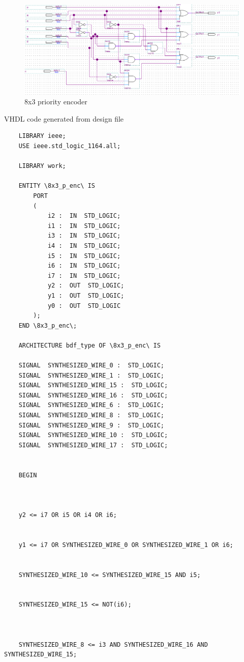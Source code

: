 \documentclass[12pt]{article}
\begin{document}
\begin{figure}[h]
\caption{8x3 priority encoder}
\centering
\includegraphics[width=\textwidth]{./diagrams/8x3_penc_design.png}
\end{figure}
{VHDL code generated from design file}
\begin{verbatim}
    LIBRARY ieee;
    USE ieee.std_logic_1164.all; 
    
    LIBRARY work;
    
    ENTITY \8x3_p_enc\ IS 
    	PORT
    	(
    		i2 :  IN  STD_LOGIC;
    		i1 :  IN  STD_LOGIC;
    		i3 :  IN  STD_LOGIC;
    		i4 :  IN  STD_LOGIC;
    		i5 :  IN  STD_LOGIC;
    		i6 :  IN  STD_LOGIC;
    		i7 :  IN  STD_LOGIC;
    		y2 :  OUT  STD_LOGIC;
    		y1 :  OUT  STD_LOGIC;
    		y0 :  OUT  STD_LOGIC
    	);
    END \8x3_p_enc\;
    
    ARCHITECTURE bdf_type OF \8x3_p_enc\ IS 
    
    SIGNAL	SYNTHESIZED_WIRE_0 :  STD_LOGIC;
    SIGNAL	SYNTHESIZED_WIRE_1 :  STD_LOGIC;
    SIGNAL	SYNTHESIZED_WIRE_15 :  STD_LOGIC;
    SIGNAL	SYNTHESIZED_WIRE_16 :  STD_LOGIC;
    SIGNAL	SYNTHESIZED_WIRE_6 :  STD_LOGIC;
    SIGNAL	SYNTHESIZED_WIRE_8 :  STD_LOGIC;
    SIGNAL	SYNTHESIZED_WIRE_9 :  STD_LOGIC;
    SIGNAL	SYNTHESIZED_WIRE_10 :  STD_LOGIC;
    SIGNAL	SYNTHESIZED_WIRE_17 :  STD_LOGIC;
    
    
    BEGIN 
    
    
    
    y2 <= i7 OR i5 OR i4 OR i6;
    
    
    y1 <= i7 OR SYNTHESIZED_WIRE_0 OR SYNTHESIZED_WIRE_1 OR i6;
    
    
    SYNTHESIZED_WIRE_10 <= SYNTHESIZED_WIRE_15 AND i5;
    
    
    SYNTHESIZED_WIRE_15 <= NOT(i6);
    
    
    
    SYNTHESIZED_WIRE_8 <= i3 AND SYNTHESIZED_WIRE_16 AND SYNTHESIZED_WIRE_15;
    

\end{verbatim}
\end{document}
